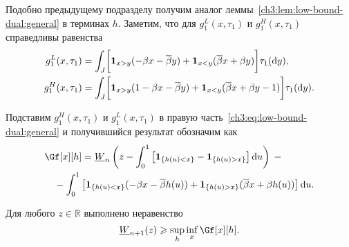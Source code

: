 {Подобно предыдущему подразделу получим аналог леммы~\ref{ch3:lem:low-bound-dual:general} в терминах $h$.
Заметим, что для $g_1^L(x, \tau_1)$ и $g_1^H(x, \tau_1)$ справедливы равенства
\begin{align*}
  g_1^L(x,\tau_1) &=
                      \int_J \biggl[
                      \mathbf{1}_{x>y} (-\beta x - {{\overline{\beta}}} y) +
                      \mathbf{1}_{x<y} ({{\overline{\beta}}} x + \beta y)
                      \biggr] \tau_1(\mathop{}\!\mathrm{d} y),\\
  g_1^H(x,\tau_1) &=
                      \int_J \biggl[
                      \mathbf{1}_{x>y} (1 -\beta x - {{\overline{\beta}}} y) +
                      \mathbf{1}_{x<y} ({{\overline{\beta}}} x + \beta y - 1)
                      \biggr] \tau_1(\mathop{}\!\mathrm{d} y).
\end{align*}

Подставим $g_1^H(x, \tau_1)$ и $g_1^L(x,\tau_1)$ в правую часть~\eqref{ch3:eq:low-bound-dual:general} и получившийся результат обозначим как
\begin{equation}\label{eq:W-low-bound:parameterized}
\begin{multlined}
  \Gf[x][h] =
  \LW{n}\left( 
    z - \int_0^1 \left[ \Ind{\{h(u) < x\}} - \Ind{\{h(u) > x\}} \right] \di u
  \right) \; - \\
  - \int_0^1 \left[ 
    \Ind{\{h(u) < x\}} (-\Co x - \DCo h(u)) + 
    \Ind{\{h(u) > x\}} (\DCo x + \Co h(u)) 
  \right] \di u.
\end{multlined}
\end{equation}

\begin{lemma}\label{ch3:lem:W-low-bound:parameterized}
  Для любого $z \in \mathbb{R}$ выполнено неравенство
  \begin{equation*}
    \LW{n+1}(z) \geqslant \sup_h \inf_{x} \Gf[x][h].
  \end{equation*}
\end{lemma}

}
